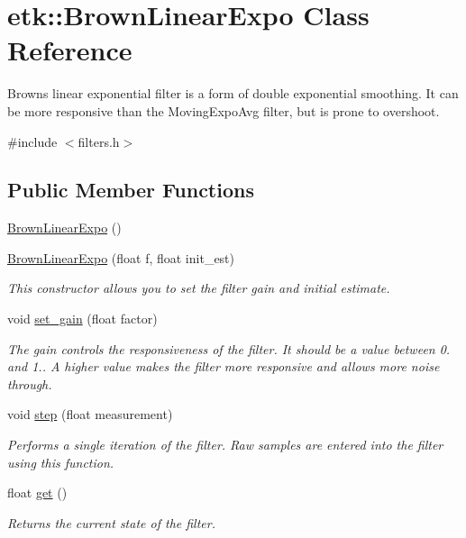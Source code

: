 \hypertarget{classetk_1_1_brown_linear_expo}{\section{etk\-:\-:Brown\-Linear\-Expo Class Reference}
\label{classetk_1_1_brown_linear_expo}
}


Browns linear exponential filter is a form of double exponential smoothing. It can be more responsive than the Moving\-Expo\-Avg filter, but is prone to overshoot.  




{\ttfamily \#include $<$filters.\-h$>$}

\subsection*{Public Member Functions}
\begin{DoxyCompactItemize}
\item 
\hyperlink{classetk_1_1_brown_linear_expo_aa214f323dc43e9e6dd5f3a8ce9f746f7}{Brown\-Linear\-Expo} ()
\item 
\hyperlink{classetk_1_1_brown_linear_expo_a7b90cde755b5ab5bdd4a11f83fc288a2}{Brown\-Linear\-Expo} (float f, float init\-\_\-est)
\begin{DoxyCompactList}\small\item\em This constructor allows you to set the filter gain and initial estimate. \end{DoxyCompactList}\item 
void \hyperlink{classetk_1_1_brown_linear_expo_ac0e42dec24086fcb2b64f3050cfa20b0}{set\-\_\-gain} (float factor)
\begin{DoxyCompactList}\small\item\em The gain controls the responsiveness of the filter. It should be a value between 0. and 1.. A higher value makes the filter more responsive and allows more noise through. \end{DoxyCompactList}\item 
void \hyperlink{classetk_1_1_brown_linear_expo_a65f7ea0377bfeea6d906e9d3fdfbc43c}{step} (float measurement)
\begin{DoxyCompactList}\small\item\em Performs a single iteration of the filter. Raw samples are entered into the filter using this function. \end{DoxyCompactList}\item 
float \hyperlink{classetk_1_1_brown_linear_expo_a6a9d611fcfc2c64bb091897676723c19}{get} ()
\begin{DoxyCompactList}\small\item\em Returns the current state of the filter. \end{DoxyCompactList}\end{DoxyCompactItemize}


